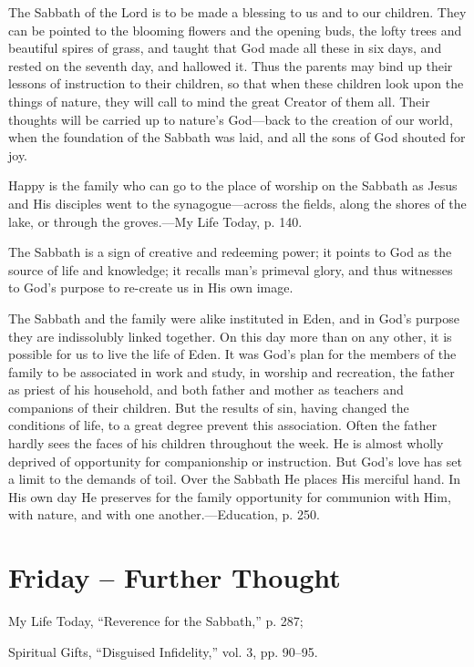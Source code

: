 \documentclass[a4paper, 10pt, twoside, headings=small]{scrartcl}
\begin{document}
\begin{multicols}{2}
The Sabbath of the Lord is to be made a blessing to us and to our children. They can be pointed to the blooming flowers and the opening buds, the lofty trees and beautiful spires of grass, and taught that God made all these in six days, and rested on the seventh day, and hallowed it. Thus the parents may bind up their lessons of instruction to their children, so that when these children look upon the things of nature, they will call to mind the great Creator of them all. Their thoughts will be carried up to nature’s God—back to the creation of our world, when the foundation of the Sabbath was laid, and all the sons of God shouted for joy.

Happy is the family who can go to the place of worship on the Sabbath as Jesus and His disciples went to the synagogue—across the fields, along the shores of the lake, or through the groves.—My Life Today, p. 140.

The Sabbath is a sign of creative and redeeming power; it points to God as the source of life and knowledge; it recalls man’s primeval glory, and thus witnesses to God’s purpose to re-create us in His own image.

The Sabbath and the family were alike instituted in Eden, and in God’s purpose they are indissolubly linked together. On this day more than on any other, it is possible for us to live the life of Eden. It was God’s plan for the members of the family to be associated in work and study, in worship and recreation, the father as priest of his household, and both father and mother as teachers and companions of their children. But the results of sin, having changed the conditions of life, to a great degree prevent this association. Often the father hardly sees the faces of his children throughout the week. He is almost wholly deprived of opportunity for companionship or instruction. But God’s love has set a limit to the demands of toil. Over the Sabbath He places His merciful hand. In His own day He preserves for the family opportunity for communion with Him, with nature, and with one another.—Education, p. 250.

\section*{Friday – Further Thought}

\setlength{\parindent}{0pt}My Life Today, “Reverence for the Sabbath,” p. 287;

Spiritual Gifts, “Disguised Infidelity,” vol. 3, pp. 90–95.

\end{multicols}
\end{document}

